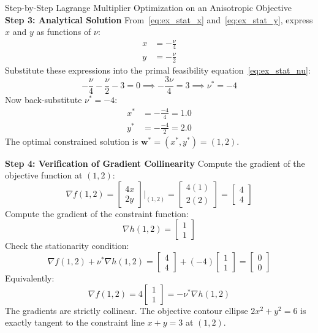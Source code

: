 \begin{examplebox}[breakable]{Step-by-Step Lagrange Multiplier Optimization on an Anisotropic Objective}
\textbf{Step 3: Analytical Solution}
From~\eqref{eq:ex_stat_x} and~\eqref{eq:ex_stat_y}, express $x$ and $y$ as functions of $\nu$:
\begin{align}
x &= -\frac{\nu}{4} \\
y &= -\frac{\nu}{2}
\end{align}
Substitute these expressions into the primal feasibility equation~\eqref{eq:ex_stat_nu}:
\begin{equation}
-\frac{\nu}{4} - \frac{\nu}{2} - 3 = 0 \implies -\frac{3\nu}{4} = 3 \implies \nu^* = -4
\end{equation}
Now back-substitute $\nu^* = -4$:
\begin{align}
x^* &= -\frac{-4}{4} = 1.0 \\
y^* &= -\frac{-4}{2} = 2.0
\end{align}
The optimal constrained solution is $\mathbf{w}^* = (x^*, y^*) = (1, 2)$.

\textbf{Step 4: Verification of Gradient Collinearity}
Compute the gradient of the objective function at $(1, 2)$:
\begin{equation}
\nabla f(1, 2) = \begin{bmatrix} 4x \\ 2y \end{bmatrix}\Bigg|_{(1, 2)} = \begin{bmatrix} 4(1) \\ 2(2) \end{bmatrix} = \begin{bmatrix} 4 \\ 4 \end{bmatrix}
\end{equation}
Compute the gradient of the constraint function:
\begin{equation}
\nabla h(1, 2) = \begin{bmatrix} 1 \\ 1 \end{bmatrix}
\end{equation}
Check the stationarity condition:
\begin{equation}
\nabla f(1, 2) + \nu^* \nabla h(1, 2) = \begin{bmatrix} 4 \\ 4 \end{bmatrix} + (-4) \begin{bmatrix} 1 \\ 1 \end{bmatrix} = \begin{bmatrix} 0 \\ 0 \end{bmatrix}
\end{equation}
Equivalently:
\begin{equation}
\nabla f(1, 2) = 4 \begin{bmatrix} 1 \\ 1 \end{bmatrix} = -\nu^* \nabla h(1, 2)
\end{equation}
The gradients are strictly collinear. The objective contour ellipse $2x^2 + y^2 = 6$ is exactly tangent to the constraint line $x + y = 3$ at $(1, 2)$.


\end{examplebox}
